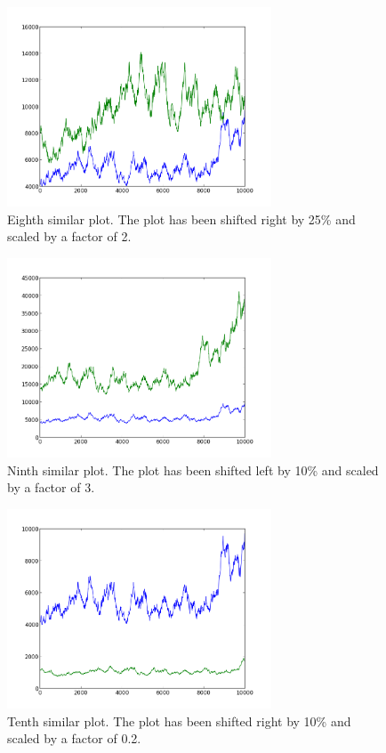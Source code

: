 \begin{figure}[h!]
    \centering
    \includegraphics[width=0.7\textwidth]{images/mutant_8.png}
    \caption{Eighth similar plot.  The plot has been shifted right by 25\% and scaled by a factor of 2.}
    \label{fig:mutant_8}
\end{figure}

\begin{figure}[h!]
    \centering
    \includegraphics[width=0.7\textwidth]{images/mutant_9.png}
    \caption{Ninth similar plot.  The plot has been shifted left by 10\% and scaled by a factor of 3.}
    \label{fig:mutant_9}
\end{figure}

\begin{figure}[h!]
    \centering
    \includegraphics[width=0.7\textwidth]{images/mutant_10.png}
    \caption{Tenth similar plot.  The plot has been shifted right by 10\% and scaled by a factor of 0.2.}
    \label{fig:mutant_10}
\end{figure}

